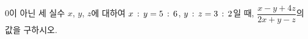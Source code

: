 $0$이 아닌 세 실수 $x$, $y$, $z$에 대하여 $x\mkern3mu :\mkern3mu y=5\mkern3mu :\mkern3mu 6$, $y\mkern3mu :\mkern3mu z=3\mkern3mu :\mkern3mu 2$일 때, $\dfrac{x-y+4z}{2x+y-z}$의 값을 구하시오.

